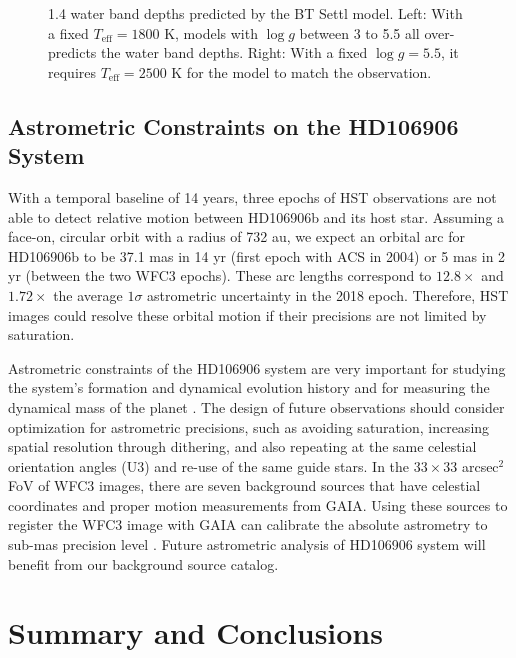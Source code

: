 \documentclass[twocolumn]{aastex62}
\begin{document}
\begin{figure}
  \centering
  \caption[Comparison of 1.4 \micron{} water band depths between observations of HD106906b and the  predictions of the BT Settl model.]{1.4 \micron{} water band depths predicted by the BT Settl model. Left: With a fixed $T_{\mathrm{eff}}=1800$ K, models with $\log g$ between 3 to 5.5 all over-predicts the water band depths. Right: With a fixed $\log g=5.5$, it requires $T_{\mathrm{eff}}=2500$ K for the model to match the observation.}
  \label{fig:waterdepth}
\end{figure}

\subsection{Astrometric Constraints on the  HD106906 System}
\label{sec:HD106906:astrometry-discussion}
With a temporal baseline of 14 years, three epochs of HST observations are not able to detect relative motion between HD106906b and its host star. Assuming a face-on, circular orbit with a radius of 732 au, we expect an orbital arc for HD106906b to be 37.1 mas in 14 yr (first epoch with ACS in 2004) or 5 mas in 2 yr (between the two WFC3 epochs). These arc lengths correspond to $12.8\times$ and $1.72\times$ the average $1\sigma$ astrometric uncertainty in the 2018 epoch. Therefore, HST images could resolve these orbital motion if their precisions are not limited by saturation.

Astrometric constraints of the HD106906 system are very important for studying the system's formation and dynamical evolution history \citep[e.g., ][]{DeRosa2019} and for measuring the dynamical mass of the planet \citep[e.g.,][]{Snellen2018,Dupuy2019}. The design of future observations should consider optimization for astrometric precisions, such as avoiding saturation, increasing spatial resolution through dithering, and also repeating at the same celestial orientation angles (U3) and re-use of the same guide stars. In the $33\times33$ arcsec$^{2}$ FoV of WFC3 images, there are seven background sources that have {celestial} coordinates and proper motion measurements from GAIA. Using these sources to register the WFC3 image with GAIA can calibrate the absolute astrometry to sub-mas precision level \citep{Bedin2018}. Future astrometric analysis of HD106906 system will  benefit from our background source catalog.

\section{Summary and Conclusions}
\end{document}

